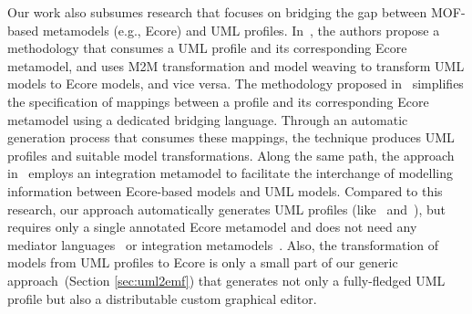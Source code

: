 Our work also subsumes research that focuses on bridging the gap between 
MOF-based metamodels (e.g., Ecore) and UML profiles.
In~\cite{abouzahra2005practical}, the authors propose a methodology 
that consumes a UML profile and its corresponding Ecore metamodel, and uses
M2M transformation and model weaving to transform UML models to 
Ecore models, and vice versa. The methodology proposed 
in~\cite{Wimmer2009:IJWIS} simplifies the specification of mappings 
between a profile and its corresponding Ecore metamodel using a dedicated 
bridging language. Through an automatic generation process that consumes
these mappings, the technique produces UML profiles and suitable model 
transformations. 
Along the same path, the approach in~\cite{Giachetti2009:ICRCIS} employs an 
integration metamodel to facilitate the interchange of modelling information 
between Ecore-based models and UML models. Compared to this research, our 
approach automatically generates UML 
profiles (like~\cite{Wimmer2009:IJWIS} 
and~\cite{Giachetti2009:ICRCIS}), but requires only a single annotated Ecore 
metamodel and does not need any mediator 
languages~\cite{Wimmer2009:IJWIS} 
or integration metamodels~\cite{Giachetti2009:ICRCIS}. Also, the transformation 
of models from UML profiles to Ecore is only a small part of our generic 
approach~(Section \ref{sec:uml2emf}) that generates not only a fully-fledged 
UML profile but also a distributable custom graphical editor. 

 










